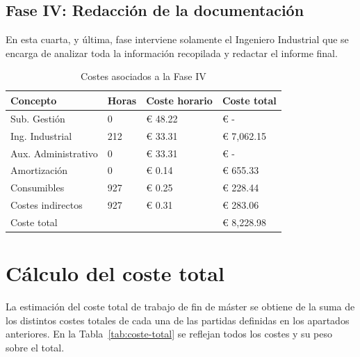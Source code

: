 \subsection{Fase IV: Redacción de la documentación}

En esta cuarta, y última, fase interviene solamente el Ingeniero Industrial que se encarga de analizar toda la información recopilada y redactar el informe final.

\begin{table}[H]
    \centering
    \begin{tabular}{llll}
        \toprule
        Concepto            & Horas & Coste horario & Coste total \\
        \midrule
        Sub. Gestión        & 0     & € 48.22       & € -         \\
        Ing. Industrial     & 212   & € 33.31       & € 7,062.15  \\
        Aux. Administrativo & 0     & € 33.31       & € -         \\
        Amortización        & 0     & € 0.14        & € 655.33    \\
        Consumibles         & 927   & € 0.25        & € 228.44    \\
        Costes indirectos   & 927   & € 0.31        & € 283.06    \\
        \midrule
        Coste total         &       &               & € 8,228.98  \\
        \bottomrule
    \end{tabular}
    \caption{Costes asociados a la Fase IV}
    \label{tab:fase-redaccion}
\end{table}

\section{Cálculo del coste total}

La estimación del coste total de trabajo de fin de máster se obtiene de la suma de los distintos costes totales de cada una de las partidas definidas en los apartados anteriores.
En la Tabla~\ref{tab:coste-total} se reflejan todos los costes y su peso sobre el total.

